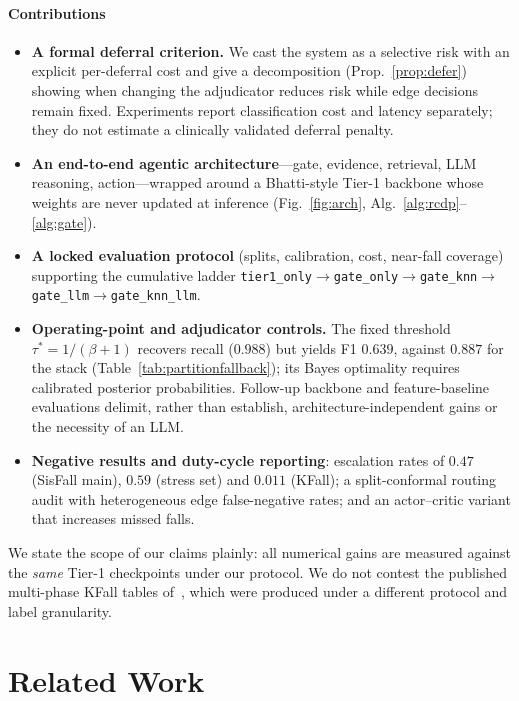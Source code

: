 \documentclass[journal]{IEEEtran}
\begin{document}
\paragraph{Contributions}
\begin{itemize}
\item \textbf{A formal deferral criterion.} We cast the system as a selective risk with an explicit per-deferral cost and give a decomposition (Prop.~\ref{prop:defer}) showing when changing the adjudicator reduces risk while edge decisions remain fixed. Experiments report classification cost and latency separately; they do not estimate a clinically validated deferral penalty.
\item \textbf{An end-to-end agentic architecture}---gate, evidence, retrieval, LLM reasoning, action---wrapped around a Bhatti-style Tier-1 backbone whose weights are never updated at inference (Fig.~\ref{fig:arch}, Alg.~\ref{alg:rcdp}--\ref{alg:gate}).
\item \textbf{A locked evaluation protocol} (splits, calibration, cost, near-fall coverage) supporting the cumulative ladder \texttt{tier1\_only}$\rightarrow$\texttt{gate\_only}$\rightarrow$\texttt{gate\_knn}$\rightarrow$\texttt{gate\_llm}$\rightarrow$\texttt{gate\_knn\_llm}.
\item \textbf{Operating-point and adjudicator controls.} The fixed threshold $\tau^\ast{=}1/(\beta{+}1)$ recovers recall ($0.988$) but yields F1 $0.639$, against $0.887$ for the stack (Table~\ref{tab:partitionfallback}); its Bayes optimality requires calibrated posterior probabilities. Follow-up backbone and feature-baseline evaluations delimit, rather than establish, architecture-independent gains or the necessity of an LLM.
\item \textbf{Negative results and duty-cycle reporting}: escalation rates of $0.47$ (SisFall main), $0.59$ (stress set) and $0.011$ (KFall); a split-conformal routing audit with heterogeneous edge false-negative rates; and an actor--critic variant that increases missed falls.
\end{itemize}

We state the scope of our claims plainly: all numerical gains are measured against the \emph{same} Tier-1 checkpoints under our protocol. We do not contest the published multi-phase KFall tables of~\cite{bhatti2025beyond}, which were produced under a different protocol and label granularity.

\section{Related Work}
\label{sec:related}
\end{document}
